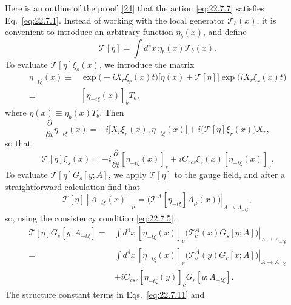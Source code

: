 Here is an outline of the proof~\hyperref[ch22-ref-24]{[24]} that the
action \eqref{eq:22.7.7} satisfies Eq.~\eqref{eq:22.7.1}. Instead of
working with the local generator $\mathcal T_b(x)$, it is convenient
to introduce an arbitrary function $\eta_b(x)$, and define
\begin{equation}
 \mathcal T[\eta]
 =\int d^4x\,\eta_b(x)\mathcal T_b(x).
 \tag{22.7.9}\label{eq:22.7.9}
\end{equation}
To evaluate $\mathcal T[\eta]\xi_s(x)$, we introduce the matrix
\begin{equation}
 \begin{aligned}
 \eta_{-t\xi}(x)
 \equiv{}&\exp\bigl(-iX_r\xi_r(x)t\bigr)
 \bigl[\eta(x)+\mathcal T[\eta]\bigr]
 \exp\bigl(iX_r\xi_r(x)t\bigr)
 \\
 \equiv{}&[\eta_{-t\xi}(x)]_b T_b,
 \end{aligned}
 \tag{22.7.10}\label{eq:22.7.10}
\end{equation}
where $\eta(x)\equiv\eta_b(x)T_b$. Then
\[
 \frac{\partial}{\partial t}\eta_{-t\xi}(x)
 =-i\bigl[X_r\xi_r(x),\eta_{-t\xi}(x)\bigr]
 +i\bigl(\mathcal T[\eta]\xi_r(x)\bigr)X_r,
\]
so that
\begin{equation}
 \mathcal T[\eta]\xi_s(x)
 =-i\frac{\partial}{\partial t}[\eta_{-t\xi}(x)]_s
 +iC_{rc s}\xi_r(x)[\eta_{-t\xi}(x)]_c.
 \tag{22.7.11}\label{eq:22.7.11}
\end{equation}
To evaluate $\mathcal T[\eta]G_s[y;A]$, we apply $\mathcal T[\eta]$ to
the gauge field, and after a straightforward calculation find that
\begin{equation}
 \mathcal T[\eta][A_{-t\xi}(x)]_\mu
 =\left.
 \bigl(\mathcal T^A[\eta_{-t\xi}]A_\mu(x)\bigr)
 \right|_{A\to A_{-t\xi}},
 \tag{22.7.12}\label{eq:22.7.12}
\end{equation}
so, using the consistency condition \eqref{eq:22.7.5},
\begin{equation}
 \begin{aligned}
 \mathcal T[\eta]G_s[y;A_{-t\xi}]
 ={}&\int d^4x\,[\eta_{-t\xi}(x)]_c
 \left.
 \bigl(\mathcal T_c^A(x)G_s[y;A]\bigr)
 \right|_{A\to A_{-t\xi}}
 \\
 ={}&\int d^4x\,[\eta_{-t\xi}(x)]_r
 \left.
 \bigl(\mathcal T_s^A(y)G_r[x;A]\bigr)
 \right|_{A\to A_{-t\xi}}
 \\
 &+iC_{c sr}[\eta_{-t\xi}(y)]_c
 G_r[y;A_{-t\xi}].
 \end{aligned}
 \tag{22.7.13}\label{eq:22.7.13}
\end{equation}
The structure constant terms in Eqs.~\eqref{eq:22.7.11} and
